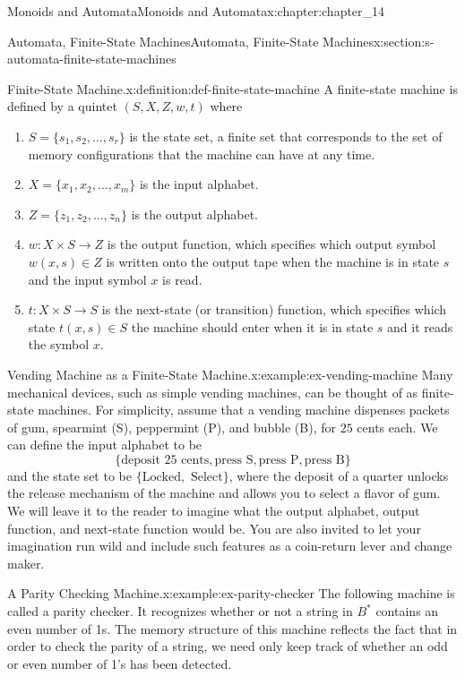 \documentclass[oneside,10pt,]{book}
\numberwithin{equation}{section}
\begin{document}
\begin{chapterptx}{Monoids and Automata}{}{Monoids and Automata}{}{}{x:chapter:chapter_14}
\begin{sectionptx}{Automata, Finite-State Machines}{}{Automata, Finite-State Machines}{}{}{x:section:s-automata-finite-state-machines}
\begin{definition}{Finite-State Machine.}{x:definition:def-finite-state-machine}%
%
\label{g:notation:idm546593955184}%
A finite-state machine is defined by a quintet \((S, X, Z, w, t)\) where%
\begin{enumerate}[label=(\arabic*)]
\item{}\(S=\{s_1, s_2,\ldots  , s_r\}\) is the state set, a finite set that corresponds to the set of memory configurations that the machine can have at any time.%
\item{}\(X=\{x_1, x_2, \ldots  ,x_m\}\) is the input alphabet.%
\item{}\(Z=\{z_1,z_2, \ldots  ,z_n\}\) is the output alphabet.%
\item{}\(w: X\times S \to Z\) is the output function, which specifies which output symbol \(w(x, s) \in Z\) is written onto the output tape when the machine is in state \(s\) and the input symbol \(x\) is read.%
\item{}\(t:X\times S\to S\) is the next-state (or transition) function, which specifies which state \(t(x, s) \in S\) the machine should enter when it is in state \(s\) and it reads the symbol \(x\).%
\end{enumerate}
%
\end{definition}
\begin{example}{Vending Machine as a Finite-State Machine.}{x:example:ex-vending-machine}%
Many mechanical devices, such as simple vending machines, can be thought of as finite-state machines. For simplicity, assume that a vending machine dispenses packets of gum, spearmint (S), peppermint (P), and bubble (B), for \(25\) cents each. We can define the input alphabet to be%
\begin{equation*}
\{\textrm{deposit 25 cents}, \textrm{press S}, \textrm{press P}, \textrm{press B}\}
\end{equation*}
and the state set to be \(\{\textrm{Locked}, \textrm{ Select}\}\), where the deposit of a quarter unlocks the release mechanism of the machine and allows you to select a flavor of gum. We will leave it to the reader to imagine what the output alphabet, output function, and next-state function would be. You are also invited to let your imagination run wild and include such features as a coin-return lever and change maker.%
\end{example}
\begin{example}{A Parity Checking Machine.}{x:example:ex-parity-checker}%
The following machine is called a parity checker.  It recognizes whether or not a string in \(B^*\)  contains an even number of 1s. The memory structure of this machine reflects the fact that in order to check the parity of a string, we need only keep track of whether an odd or even number of 1's has been detected.%

\end{example}
\end{sectionptx}
\end{chapterptx}
\end{document}
